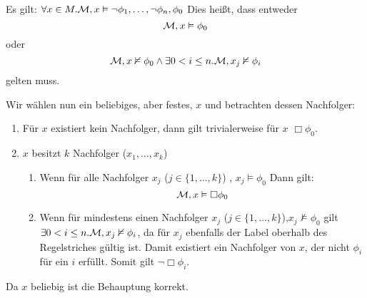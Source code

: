 Es gilt: $\forall x \in M.\mathcal{M},x\vDash \neg \phi_1,\dots,\neg \phi_n,\phi_0$
Dies heißt, dass entweder \[\mathcal{M},x \vDash \phi_0\] oder \[\mathcal{M},x
\nvDash \phi_0 \wedge \exists 0 < i \leq n.\mathcal{M},x_j \nvDash \phi_i\] gelten muss.

Wir wählen nun ein beliebiges, aber festes, $x$ und betrachten dessen
Nachfolger:
\begin{enumerate}
	\item Für $x$ existiert kein Nachfolger, dann gilt trivialerweise für $x$
		$\Box \phi_0$.
	\item $x$ besitzt $k$ Nachfolger ($x_1, \dots, x_k$)
		\begin{enumerate}
			\item Wenn für alle Nachfolger $x_j$ ($j \in \{1, \dots, k\}$)
				, $x_j \vDash \phi_0$
				Dann gilt:
				\[\mathcal{M}, x \vDash \Box \phi_0\]
			\item Wenn für mindestens einen Nachfolger $x_j$ ($j \in \{1,
				\dots,k\}$),$x_j \nvDash \phi_0$ gilt $\exists 0 < i \leq n.\mathcal{M},x_j \nvDash
				\phi_i$, da für $x_j$ ebenfalls der Label oberhalb des
				Regelstriches gültig ist. Damit existiert ein Nachfolger von
				$x$, der nicht $\phi_i$ für ein $i$ erfüllt. Somit gilt $\neg
				\Box \phi_i$.
		\end{enumerate}
\end{enumerate}
Da $x$ beliebig ist die Behauptung korrekt.

